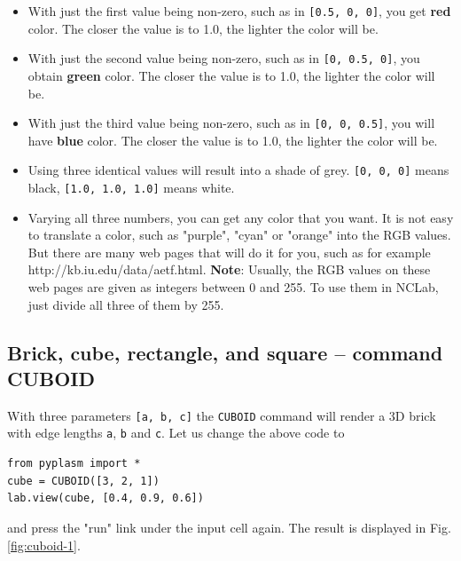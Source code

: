 \documentclass{article}
\begin{document}
\begin{itemize}
\item With just the first value being non-zero, such as in {\tt [0.5, 0, 0]},
      you get {\bf red} color. The closer the value is to 1.0, the lighter the color
      will be.
\item With just the second value being non-zero, such as in {\tt [0, 0.5, 0]},
      you obtain {\bf green} color. The closer the  value is to 1.0, the lighter the color
      will be.
\item With just the third value being non-zero, such as in {\tt [0, 0, 0.5]},
      you will have {\bf blue} color. The closer the  value is to 1.0, the lighter the color
      will be.
\item Using three identical values will result into a shade of grey. {\tt [0, 0, 0]}
      means black, {\tt [1.0, 1.0, 1.0]} means white.
\item Varying all three numbers, you can get any color that you want. It is not 
      easy to translate a color, such as "purple", "cyan" or "orange" into the RGB
      values. But there are many web pages that will do it for you, such as for
      example http://kb.iu.edu/data/aetf.html. {\bf Note}: Usually,
      the RGB values on these web pages are given as integers between 0 and 255. To use them in NCLab,
      just divide all three of them by 255.
\end{itemize}

 
\subsection{Brick, cube, rectangle, and square -- command CUBOID}

With three parameters {\tt [a, b, c]} the {\tt CUBOID} command will render 
a 3D brick with edge lengths {\tt a}, {\tt b} and {\tt c}. Let us change the 
above code to  

\begin{verbatim}
from pyplasm import *
cube = CUBOID([3, 2, 1])
lab.view(cube, [0.4, 0.9, 0.6])
\end{verbatim}
and press the "run" link under the input cell again. The result is 
displayed in Fig. \ref{fig:cuboid-1}.
\end{document}

